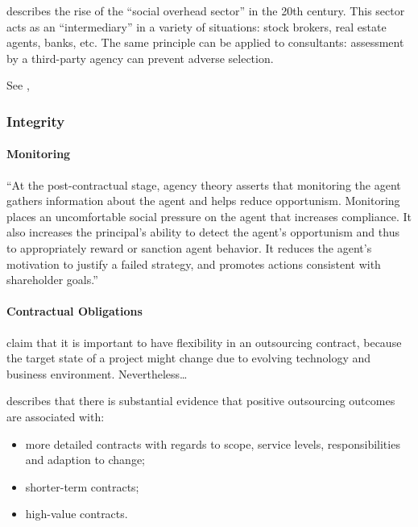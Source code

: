 \documentclass[12pt]{article}
\providecommand{\tightlist}{%
  \setlength{\itemsep}{0pt}\setlength{\parskip}{0pt}}
\begin{document}
\citet[57-62]{zucker1985} describes the rise of the ``social overhead
sector'' in the 20th century. This sector acts as an ``intermediary'' in
a variety of situations: stock brokers, real estate agents, banks, etc.
The same principle can be applied to consultants: assessment by a
third-party agency can prevent adverse selection.

See \citep[ 76-77]{armbruster2006},

\hypertarget{integrity}{%
\subsubsection{Integrity}\label{integrity}}

\hypertarget{monitoring}{%
\paragraph{Monitoring}\label{monitoring}}

``At the post-contractual stage, agency theory asserts that monitoring
the agent gathers information about the agent and helps reduce
opportunism. Monitoring places an uncomfortable social pressure on the
agent that increases compliance. It also increases the principal's
ability to detect the agent's opportunism and thus to appropriately
reward or sanction agent behavior. It reduces the agent's motivation to
justify a failed strategy, and promotes actions consistent with
shareholder goals.'' \citep[ 13]{basu2011}

\hypertarget{contractual-obligations}{%
\paragraph{Contractual Obligations}\label{contractual-obligations}}

\citet{mcfarlan1995} claim that it is important to have flexibility in
an outsourcing contract, because the target state of a project might
change due to evolving technology and business environment.
Nevertheless\ldots{}

\citet[4]{lacity2012} describes that there is substantial evidence that
positive outsourcing outcomes are associated with:

\begin{itemize}
\tightlist
\item
  more detailed contracts with regards to scope, service levels,
  responsibilities and adaption to change;
\item
  shorter-term contracts;
\item
  high-value contracts.
\end{itemize}
\end{document}
